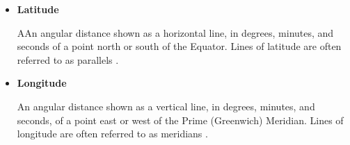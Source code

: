 \begin{itemize}
 	\item \textbf{Latitude}
 	\begin{adjustwidth}{2.5em}{0pt}
	AAn angular distance shown as a horizontal line, in degrees, minutes, and seconds of a point north or south of the Equator. Lines of latitude are often referred to as parallels \cite{latAndLong}.
	\\
 	\end{adjustwidth}

 	\item \textbf{Longitude}
 	\begin{adjustwidth}{2.5em}{0pt}
	An angular distance shown as a vertical line, in degrees, minutes, and seconds, of a point east or west of the Prime (Greenwich) Meridian. Lines of longitude are often referred to as meridians \cite{latAndLong}.
 	\end{adjustwidth}
\end{itemize}